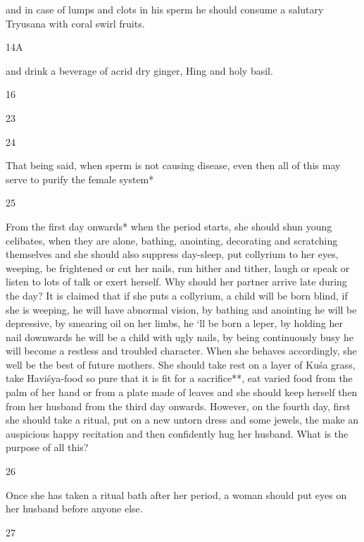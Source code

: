 \begin{translation}
\begin{tt}
and in case of lumps and clots in his sperm he should consume a 
  salutary Tryusana with coral swirl fruits.
  
\item[14A]

and drink a beverage of acrid dry ginger, Hing and holy basil.
  
\item[16]


\item[23]


  
\item[24]

That being said, when sperm is not causing disease, even then all of this 
  may serve to purify the female system*
  
\item[25]

From the first day onwards* when the period starts, she  should shun 
  young celibates, when they are alone, bathing, anointing, decorating and 
  scratching themselves and she should also suppress day-sleep, put collyrium to 
  her eyes, weeping, be frightened or cut her nails, run hither and tither, laugh or 
  speak or listen to lots of talk or exert herself. Why should her partner arrive 
  late during the day? It is claimed that if she puts a collyrium, a child will be born 
  blind, if she is weeping, he will have abnormal vision, by bathing and anointing 
  he will be depressive, by smearing oil on her limbs, he ‘ll be born a leper, by 
  holding her nail downwards he will be a child with ugly nails, by being 
  continuously busy he will become a restless and troubled character. When she 
  behaves accordingly, she well be the best of future mothers. She should take 
  rest on a layer of Kuśa  grass,  take Haviśya-food so pure that it is fit for a 
  sacrifice**, eat varied food from the palm of her hand or from a plate made of 
  leaves and she should keep herself then from her husband from the third day 
  onwards. However, on the fourth day, first she should take a ritual, put on a 
  new untorn dress and some jewels, the make an auspicious happy recitation 
  and then confidently hug her husband. What is the purpose of all this?
  
\item[26]

Once she has taken a ritual bath after her period, a woman should put 
  eyes on her husband before anyone else.
  
\item[27]


\end{tt}
\end{translation}
